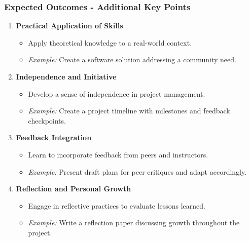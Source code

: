 \documentclass[aspectratio=169]{beamer}
\begin{document}
\begin{frame}[fragile]
    \frametitle{Expected Outcomes - Additional Key Points}
    \begin{enumerate}[resume]
        \item \textbf{Practical Application of Skills}
            \begin{itemize}
                \item Apply theoretical knowledge to a real-world context.
                \item \textit{Example:} Create a software solution addressing a community need.
            \end{itemize}
        \item \textbf{Independence and Initiative}
            \begin{itemize}
                \item Develop a sense of independence in project management.
                \item \textit{Example:} Create a project timeline with milestones and feedback checkpoints.
            \end{itemize}
        \item \textbf{Feedback Integration}
            \begin{itemize}
                \item Learn to incorporate feedback from peers and instructors.
                \item \textit{Example:} Present draft plans for peer critiques and adapt accordingly.
            \end{itemize}
        \item \textbf{Reflection and Personal Growth}
            \begin{itemize}
                \item Engage in reflective practices to evaluate lessons learned.
                \item \textit{Example:} Write a reflection paper discussing growth throughout the project.
            \end{itemize}
    \end{enumerate}
\end{frame}
\end{document}
